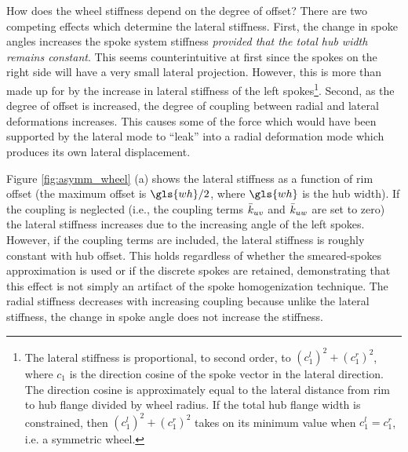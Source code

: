 \documentclass[\rootdir/thesis.tex]{subfiles}
\begin{document}
How does the wheel stiffness depend on the degree of offset? There are two competing effects which determine the lateral stiffness. First, the change in spoke angles increases the spoke system stiffness \emph{provided that the total hub width remains constant}. This seems counterintuitive at first since the spokes on the right side will have a very small lateral projection. However, this is more than made up for by the increase in lateral stiffness of the left spokes\footnote{The lateral stiffness is proportional, to second order, to $(c_1^l)^2 + (c_1^r)^2$, where $c_1$ is the direction cosine of the spoke vector in the lateral direction. The direction cosine is approximately equal to the lateral distance from rim to hub flange divided by wheel radius. If the total hub flange width is constrained, then $(c_1^l)^2 + (c_1^r)^2$ takes on its minimum value when $c_1^l = c_1^r$, i.e. a symmetric wheel.}. Second, as the degree of offset is increased, the degree of coupling between radial and lateral deformations increases. This causes some of the force which would have been supported by the lateral mode to ``leak'' into a radial deformation mode which produces its own lateral displacement.

Figure \ref{fig:asymm_wheel} (a) shows the lateral stiffness as a function of rim offset (the maximum offset is $\gls{wh}/2$, where $\gls{wh}$ is the hub width). If the coupling is neglected (i.e., the coupling terms $\bar{k}_{uv}$ and $\bar{k}_{uw}$ are set to zero) the lateral stiffness increases due to the increasing angle of the left spokes. However, if the coupling terms are included, the lateral stiffness is roughly constant with hub offset. This holds regardless of whether the smeared-spokes approximation is used or if the discrete spokes are retained, demonstrating that this effect is not simply an artifact of the spoke homogenization technique. The radial stiffness decreases with increasing coupling because unlike the lateral stiffness, the change in spoke angle does not increase the stiffness.
\end{document}
